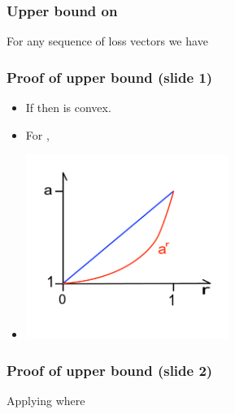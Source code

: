 \documentclass[handout]{beamer}
\begin{document}
\begin{frame}
\frametitle{Upper bound on }
\begin{lemma} 
For any sequence of loss vectors 
we have
\end{lemma}
\end{frame}

\begin{frame}
\frametitle{Proof of upper bound (slide 1)}
\begin{itemize}
\item
If  then  is convex.
\item For , 
\item
\includegraphics[height=6cm]{figures/Convexity.pdf}
\end{itemize}
\end{frame}

\begin{frame}
\frametitle{Proof of upper bound (slide 2)}
Applying  where 
\end{frame}
\end{document}
